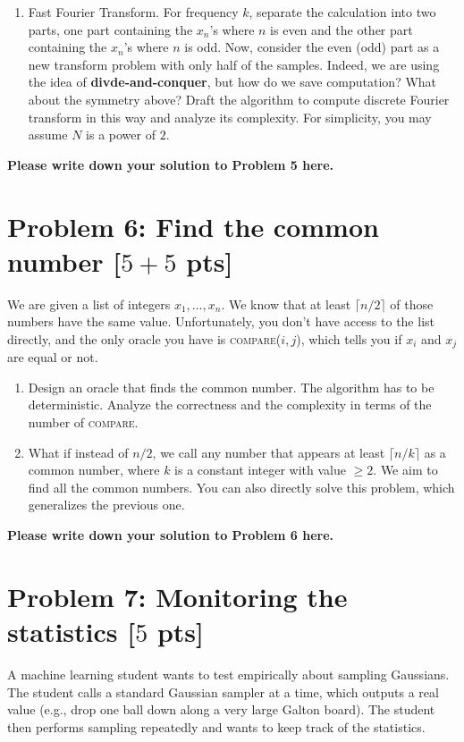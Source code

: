 \documentclass[letterpaper, 11pt]{article}
\newcommand{\1}{\mathds{1}}	%
\theoremstyle{definition}
\newcommand{\problem}[1]{\section*{Problem #1}}
\newenvironment{solution}{{\par\noindent\it Solution.}}{}
\begin{document}
\begin{enumerate}
    \item Fast Fourier Transform. For frequency $k$, separate the calculation into two parts, one part containing the $x_n$'s where $n$ is even and the other part containing the $x_n$'s where $n$ is odd. Now, consider the even (odd) part as a new transform problem with only half of the samples. Indeed, we are using the idea of \textbf{divde-and-conquer}, but how do we save computation? What about the symmetry above? Draft the algorithm to compute discrete Fourier transform in this way and analyze its complexity. For simplicity, you may assume $N$ is a power of $2$.
\end{enumerate}

\newpage
\begin{solution}
\textbf{Please write down your solution to Problem 5 here.}
\end{solution}
\newpage


\problem{6: Find the common number [$5+5$ pts]}
We are given a list of integers $x_1, \ldots, x_n$. We know that at least $\lceil n/2 \rceil$ of those numbers have the same value. Unfortunately, you don't have access to the list directly, and the only oracle you have is \textsc{compare($i,j$)}, which tells you if $x_i$ and $x_j$ are equal or not.

\begin{enumerate}
    \item Design an oracle that finds the common number. The algorithm has to be deterministic. Analyze the correctness and the complexity in terms of the number of \textsc{compare}.
    \item What if instead of $n/2$, we call any number that appears at least $\lceil n/k \rceil$ as a common number, where $k$ is a constant integer with value $\geq2$. 
    We aim to find all the common numbers. You can also directly solve this problem, which generalizes the previous one.
\end{enumerate}
\begin{solution}
\textbf{Please write down your solution to Problem 6 here.}
\end{solution}
\newpage


\problem{7: Monitoring the statistics [$5$ pts]}
A machine learning student wants to test empirically about sampling Gaussians. The student calls a standard Gaussian sampler at a time, which outputs a real value (e.g., drop one ball down along a very large Galton board). The student then performs sampling repeatedly and wants to keep track of the statistics.
\end{document}
